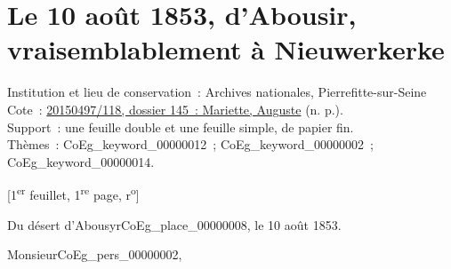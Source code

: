\documentclass{book}
\begin{document}
\hypertarget{CoEg_Mariette_1853-08-10}{}
\section*{Le 10 août 1853, d’Abousir, vraisemblablement à Nieuwerkerke}  
{\footnotesize \noindent Institution et lieu de conservation~: Archives nationales, Pierrefitte-sur-Seine\\
Cote~: \hyperlink{CoEg_Mariette_ms_001}{20150497/118, dossier 145~: Mariette, Auguste} (n. p.).\\
Support~: une feuille double et une feuille simple, de papier fin.\\
Thèmes~: \gls{CoEg_keyword_00000012}~; \gls{CoEg_keyword_00000002}~; \gls{CoEg_keyword_00000014}.
\begin{center} {[1\textsuperscript{er} feuillet, 1\textsuperscript{re} page, r\textsuperscript{o}]}\end{center}}
\begin{flushright}Du désert d’Abousyr\gls{CoEg_place_00000008}, le 10 août 1853.\end{flushright}

\hspace{1cm} Monsieur\gls{CoEg_pers_00000002},\\
\end{document}
